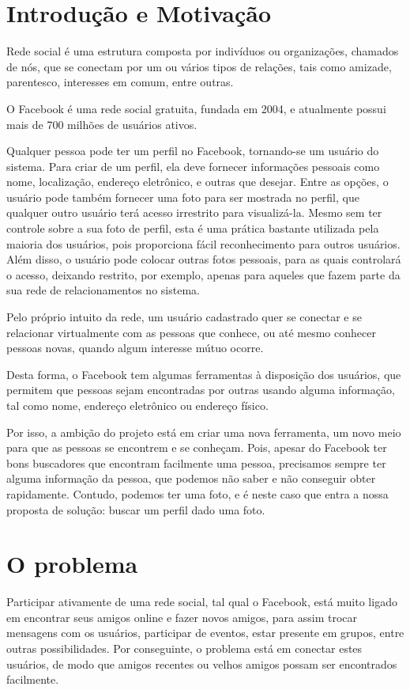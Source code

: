 \documentclass[10pt,a4paper]{article}
\begin{document}
\tableofcontents
\newpage 
\doublespacing

\section{Introdução e Motivação}

	Rede social é uma estrutura composta por indivíduos ou organizações, chamados de nós, que se conectam por um ou vários tipos de relações, tais como amizade, parentesco, interesses em comum, entre outras.
	
	O Facebook é uma rede social gratuita, fundada em 2004, e atualmente possui mais de 700 milhões de usuários ativos.

	Qualquer pessoa pode ter um perfil no Facebook, tornando-se um usuário do sistema. Para criar de um perfil, ela deve fornecer informações pessoais como nome, localização, endereço eletrônico, e outras que desejar. Entre as opções, o usuário pode também fornecer uma foto para ser mostrada no perfil, que qualquer outro usuário terá acesso irrestrito para visualizá-la. Mesmo sem ter controle sobre a sua foto de perfil, esta é uma prática bastante utilizada pela maioria dos usuários, pois proporciona fácil reconhecimento para outros usuários. Além disso, o usuário pode colocar outras fotos pessoais, para as quais controlará o acesso, deixando restrito, por exemplo, apenas para aqueles que fazem parte da sua rede de relacionamentos no sistema.

	Pelo próprio intuito da rede, um usuário cadastrado quer se conectar e se relacionar virtualmente com as pessoas que conhece, ou até mesmo conhecer pessoas novas, quando algum interesse mútuo ocorre.

	Desta forma, o Facebook tem algumas ferramentas à disposição dos usuários, que permitem que pessoas sejam encontradas por outras usando alguma informação, tal como nome, endereço eletrônico ou endereço físico.

	Por isso, a ambição do projeto está em criar uma nova ferramenta, um novo meio para que as pessoas se encontrem e se conheçam. Pois, apesar do Facebook ter bons buscadores que encontram facilmente uma pessoa, precisamos sempre ter alguma informação da pessoa, que podemos não saber e não conseguir obter rapidamente. Contudo, podemos ter uma foto, e é neste caso que entra a nossa proposta de solução: buscar um perfil dado uma foto.
\newpage
\section{O problema}
	Participar ativamente de uma rede social, tal qual o Facebook, está muito ligado em encontrar seus amigos online e fazer novos amigos, para assim trocar mensagens com os usuários, participar de eventos, estar presente em grupos, entre outras possibilidades. Por conseguinte, o problema está em conectar estes usuários, de modo que amigos recentes ou velhos amigos possam ser encontrados facilmente.
\end{document}
